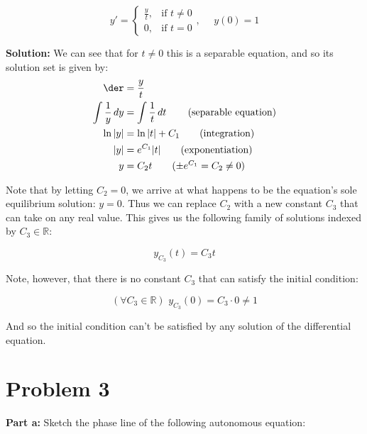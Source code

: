 \documentclass{article}
\begin{document}


\begin{equation*}
    y'=\begin{cases}
        \frac{y}{t},&\text{if }t\not=0 \\
        0,&\text{if }t=0
    \end{cases},\,\,\,\,\,\,\,\, y(0)=1
\end{equation*}

\noindent\textbf{Solution:} We can see that for $t\not=0$ this is a separable equation, and so its solution set is given by:
\begin{align*}
    \der&=\frac{y}{t}\\
    \int \frac{1}{y}\mathop{dy}&=\int \frac{1}{t}\mathop{dt}\tag{separable equation}\\
    \ln{|y|}&=\ln{|t|}+C_1\tag{integration}\\
    |y|&=e^{C_1}|t|\tag{exponentiation}\\
    y&=C_2t\tag{$\pm e^{C_1}=C_2\not=0$}
\end{align*}

Note that by letting $C_2=0$, we arrive at what happens to be the equation's sole equilibrium solution: $y=0$. Thus we can replace $C_2$ with a new constant $C_3$ that can take on any real value. This gives us the following family of solutions indexed by $C_3\in\mathbb R$:

\begin{equation*}
    y_{C_3}(t)=C_3t
\end{equation*}

Note, however, that there is no constant $C_3$ that can satisfy the initial condition:

\begin{equation*}
    (\forall C_3\in\mathbb R)\,\,y_{C_3}(0)=C_3\cdot0\not=1
\end{equation*}

And so the initial condition can't be satisfied by any solution of the differential equation.

\section*{Problem 3}
\noindent\textbf{Part a:} Sketch the phase line of the following autonomous equation:
\end{document}
